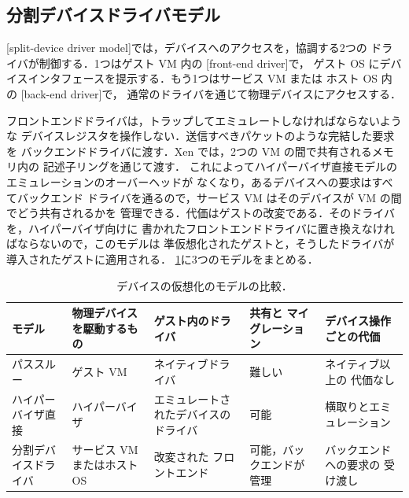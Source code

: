 \documentclass[../main.tex]{subfiles}
\begin{document}
\subsection{分割デバイスドライバモデル}

\begin{definition}[分割デバイスドライバモデル]
  [split-device driver model]では，デバイスへのアクセスを，協調する2つの
  ドライバが制御する．1つはゲスト VM 内の
  [front-end driver]で，
  ゲスト OS にデバイスインタフェースを提示する．もう1つはサービス VM または
  ホスト OS 内の
  [back-end driver]で，
  通常のドライバを通じて物理デバイスにアクセスする．
\end{definition}

フロントエンドドライバは，トラップしてエミュレートしなければならないような
デバイスレジスタを操作しない．送信すべきパケットのような完結した要求を
バックエンドドライバに渡す．Xen では，2つの VM の間で共有されるメモリ内の
記述子リングを通じて渡す．%
これによってハイパーバイザ直接モデルのエミュレーションのオーバーヘッドが
なくなり，あるデバイスへの要求はすべてバックエンド
ドライバを通るので，サービス VM はそのデバイスが VM の間でどう共有されるかを
管理できる．代価はゲストの改変である．そのドライバを，ハイパーバイザ向けに
書かれたフロントエンドドライバに置き換えなければならないので，このモデルは
準仮想化されたゲストと，そうしたドライバが導入されたゲストに適用される．
\cref{tab:l12-devices}に3つのモデルをまとめる．

\begin{table}[htbp]
  \centering
  \caption{デバイスの仮想化のモデルの比較．}
  \label{tab:l12-devices}
  \small
  \begin{tabular}{@{}>{\raggedright}p{18mm}>{\raggedright}p{19mm}%
      >{\raggedright}p{20mm}>{\raggedright}p{23mm}%
      >{\raggedright\arraybackslash}p{23mm}@{}}
    \toprule
    モデル & 物理デバイスを駆動するもの & ゲスト内のドライバ & 共有と
      マイグレーション & デバイス操作ごとの代価 \\
    \midrule
    パススルー & ゲスト VM & ネイティブドライバ & 難しい & ネイティブ以上の
      代価なし \\
    \addlinespace
    ハイパーバイザ直接 & ハイパーバイザ & エミュレートされたデバイスの
      ドライバ & 可能 & 横取りとエミュレーション \\
    \addlinespace
    分割デバイスドライバ & サービス VM またはホスト OS & 改変された
      フロントエンド & 可能，バックエンドが管理 & バックエンドへの要求の
      受け渡し \\
    \bottomrule
  \end{tabular}
\end{table}
\end{document}
